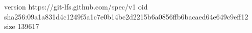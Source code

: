 version https://git-lfs.github.com/spec/v1
oid sha256:09a1a831d4c1249f5a1c7e0b14bc2d2215b6a0856ffb6bacaed64e649c9eff12
size 139617
